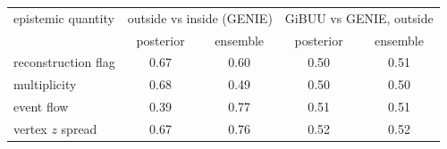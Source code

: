 \begin{tabular}{lcccc}
\toprule
epistemic quantity & \multicolumn{2}{c}{outside vs inside (GENIE)} & \multicolumn{2}{c}{GiBUU vs GENIE, outside} \\
 & posterior & ensemble & posterior & ensemble \\
\midrule
reconstruction flag & 0.67 & 0.60 & 0.50 & 0.51 \\
multiplicity & 0.68 & 0.49 & 0.50 & 0.50 \\
event flow & 0.39 & 0.77 & 0.51 & 0.51 \\
vertex $z$ spread & 0.67 & 0.76 & 0.52 & 0.52 \\
\bottomrule
\end{tabular}
